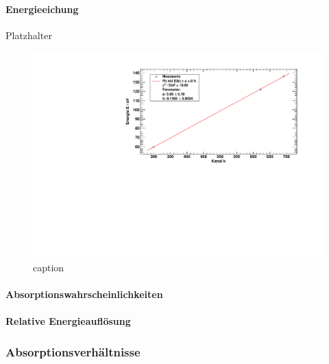 \paragraph{Energieeichung}
Platzhalter

\begin{figure}[H]
\begin{center}
  \includegraphics[width=\textwidth]{../img/part3/energygauge_Si.pdf}
  \caption{caption}
  \label{img:si:energygauge}
\end{center}
\end{figure}

\paragraph{Absorptionswahrscheinlichkeiten}

\paragraph{Relative Energieauflösung}

\subsubsection{Absorptionsverhältnisse}